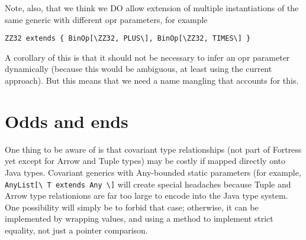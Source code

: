 \documentclass[11pt]{article}
\begin{document}
Note, also, that we think we DO allow extension of multiple instantiations of the same generic with different opr parameters, for example
\begin{verbatim}
ZZ32 extends { BinOp[\ZZ32, PLUS\], BinOp[\ZZ32, TIMES\] }
\end{verbatim}
A corollary of this is that it should not be necessary to infer an opr parameter dynamically (because this would be ambiguous, at least using the current approach).  But this means that we need a name mangling that accounts for this.




\section{Odds and ends}

One thing to be aware of is that covariant type relationships (not part of Fortress yet except for Arrow and Tuple types) may be costly if mapped directly onto Java types.  Covariant generics with Any-bounded static parameters (for example,  \verb+AnyList[\ T extends Any \]+ will create special headaches because Tuple and Arrow type relationions are far too large to encode into the Java type system.  One possibility will simply be to forbid that case; otherwise, it can be implemented by wrapping values, and using a method to implement strict equality, not just a pointer comparison. 
\end{document}
